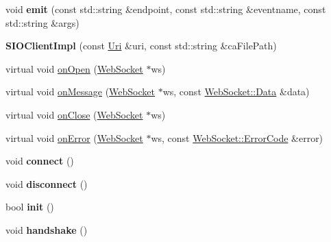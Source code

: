 \begin{DoxyCompactItemize}
void {\bfseries emit} (const std\+::string \&endpoint, const std\+::string \&eventname, const std\+::string \&args)
\item 
\mbox{\label{classnetwork_1_1SIOClientImpl_a6a23fab2426a40227bd7c94df654f34f}} 
{\bfseries S\+I\+O\+Client\+Impl} (const \hyperlink{classnetwork_1_1Uri}{Uri} \&uri, const std\+::string \&ca\+File\+Path)
\item 
virtual void \hyperlink{classnetwork_1_1SIOClientImpl_acd4c397959610482be0a8b83cf6ccc22}{on\+Open} (\hyperlink{classnetwork_1_1WebSocket}{Web\+Socket} $\ast$ws)
\item 
virtual void \hyperlink{classnetwork_1_1SIOClientImpl_a7355f331dda0c87bd3d0eb9e3b0784c6}{on\+Message} (\hyperlink{classnetwork_1_1WebSocket}{Web\+Socket} $\ast$ws, const \hyperlink{structnetwork_1_1WebSocket_1_1Data}{Web\+Socket\+::\+Data} \&data)
\item 
virtual void \hyperlink{classnetwork_1_1SIOClientImpl_aa22b75ee2e487208cca15bb2b5192397}{on\+Close} (\hyperlink{classnetwork_1_1WebSocket}{Web\+Socket} $\ast$ws)
\item 
virtual void \hyperlink{classnetwork_1_1SIOClientImpl_a850038d23057d9882f5d689bc7051008}{on\+Error} (\hyperlink{classnetwork_1_1WebSocket}{Web\+Socket} $\ast$ws, const \hyperlink{classnetwork_1_1WebSocket_a33c111a23355ac485e3a56c9d0ab9a59}{Web\+Socket\+::\+Error\+Code} \&error)
\item 
\mbox{\label{classnetwork_1_1SIOClientImpl_ace3b7641a3b6b2861efa61a81f02344f}} 
void {\bfseries connect} ()
\item 
\mbox{\label{classnetwork_1_1SIOClientImpl_a131d6f0f75fff86f7dc84069c14ea956}} 
void {\bfseries disconnect} ()
\item 
\mbox{\label{classnetwork_1_1SIOClientImpl_a9ae985d3d67c8461f26713a943102f25}} 
bool {\bfseries init} ()
\item 
\mbox{\label{classnetwork_1_1SIOClientImpl_a61f2f5737c3b218a5d10778edf0a528d}} 
void {\bfseries handshake} ()
\item 
\mbox{\label{classnetwork_1_1SIOClientImpl_a66a5d40f431df264d658b24f5ce200b6}} 

\end{DoxyCompactItemize}
